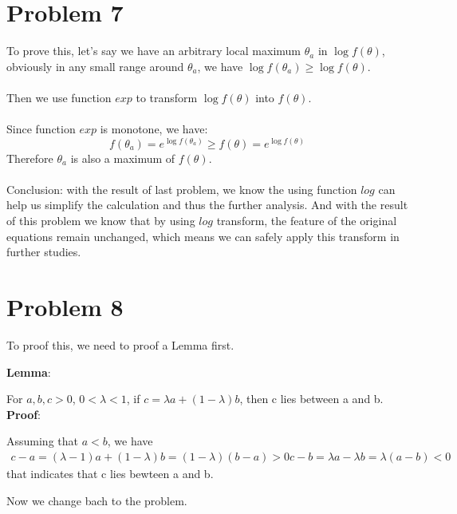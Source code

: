 \documentclass[12pt]{scrartcl}
\begin{document}
    \section*{Problem 7}
    
  To prove this, let's say we have an arbitrary local maximum $\theta_a$ in $\log f(\theta)$, obviously in any small range around $\theta_a$, we have $\log f(\theta_a) \geq \log f(\theta)$.
  \\
  \\
  Then we use function $exp$ to transform $\log f(\theta)$ into $f(\theta)$.
  \\
  \\
  Since function $exp$ is monotone, we have:
  \[f(\theta_a) = e^{\log f(\theta_a)} \geq f(\theta) = e^{\log f(\theta)}\]
  Therefore $\theta_a$ is also a maximum of $f(\theta)$.
  \\
  \\
  Conclusion: with the result of last problem, we know the using function $log$ can help us simplify the calculation and thus the further analysis. And with the result of this problem we know that by using $log$ transform, the feature of the original equations remain unchanged, which means we can safely apply this transform in further studies.
  



  
  \section*{Problem 8}
  To proof this, we need to proof a Lemma first.

  \textbf{Lemma}:

  \quad For $ a, b, c > 0 $, $0 < \lambda < 1 $, if $ c = \lambda a + (1 - \lambda) b $, then c lies between a and b. \\
  \textbf{Proof}: 

  Assuming that $a < b$, we have
  \[
    \begin{split}
      c - a = (\lambda - 1)a + (1 - \lambda)b = (1 - \lambda)(b - a) > 0
      c - b = \lambda a - \lambda b = \lambda (a - b) < 0
    \end{split}
  \]
  that indicates that c lies bewteen a and b.

  Now we change bach to the problem.
\end{document}
